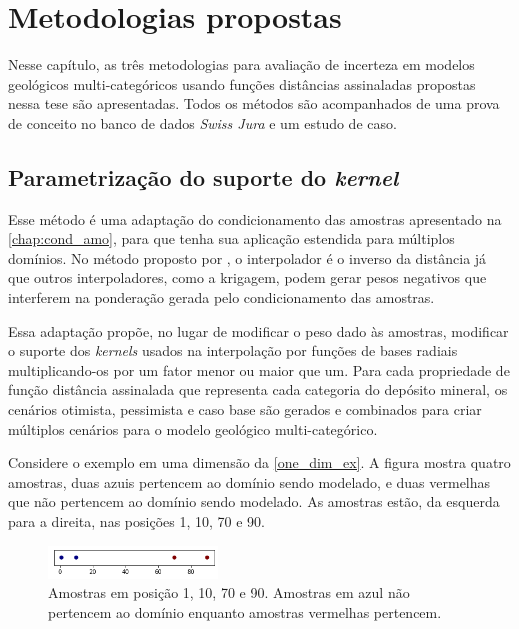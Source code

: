 \chapter{Metodologias propostas}\label{chap3}

Nesse capítulo, as três metodologias para avaliação de incerteza em modelos geológicos multi-categóricos usando funções distâncias assinaladas propostas nessa tese são apresentadas. Todos os métodos são acompanhados de uma prova de conceito no banco de dados \textit{Swiss Jura} e um estudo de caso.

\section{Parametrização do suporte do \textit{kernel}}\label{kernel_fac}

Esse método é uma adaptação do condicionamento das amostras apresentado na \autoref{chap:cond_amo}, para que tenha sua aplicação estendida para múltiplos domínios. No método proposto por , o interpolador é o inverso da distância já que outros interpoladores, como a krigagem, podem gerar pesos negativos que interferem na ponderação gerada pelo condicionamento das amostras.

Essa adaptação propõe, no lugar de modificar o peso dado às amostras, modificar o suporte dos \textit{kernels} usados na interpolação por funções de bases radiais multiplicando-os por um fator menor ou maior que um. Para cada propriedade de função distância assinalada que representa cada categoria do depósito mineral, os cenários otimista, pessimista e caso base são gerados e combinados para criar múltiplos cenários para o modelo geológico multi-categórico.

Considere o exemplo em uma dimensão da \autoref{one_dim_ex}. A figura mostra quatro amostras, duas azuis pertencem ao domínio sendo modelado, e duas vermelhas que não pertencem ao domínio sendo modelado. As amostras estão, da esquerda para a direita, nas posições 1, 10, 70 e 90.

\begin{figure}[H]
	\caption{\label{one_dim_ex} Amostras em posição 1, 10, 70 e 90. Amostras em azul não pertencem ao domínio enquanto amostras vermelhas pertencem.}
	\centering
		\includegraphics[width=0.4\textwidth]{capitulo_3/imagens/pointssd.png}
\end{figure}

